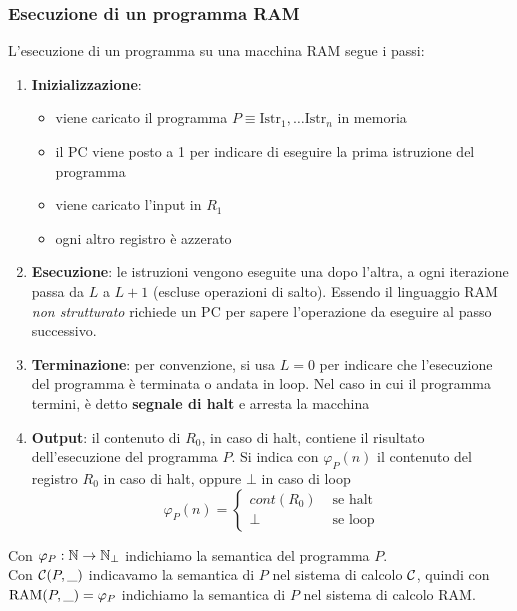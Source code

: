 \begin{center}
	
\end{center}

\subsubsection{Esecuzione di un programma RAM}

L'esecuzione di un programma su una macchina RAM segue i passi:
\begin{enumerate}
	\item \textbf{Inizializzazione}:
	\begin{itemize}
		\item viene caricato il programma $P \equiv \text{Istr}_1, \dots \text{Istr}_n$ in memoria
		\item il PC viene posto a 1 per indicare di eseguire la prima istruzione del programma
		\item viene caricato l'input in $R_1$
		\item ogni altro registro è azzerato
	\end{itemize}
	\item \textbf{Esecuzione}: le istruzioni vengono eseguite una dopo l'altra, a ogni iterazione passa da $L$ a $L+1$ (escluse operazioni di salto). Essendo il linguaggio RAM \textit{non strutturato} richiede un PC per sapere l'operazione da eseguire al passo successivo.
	\item \textbf{Terminazione}: per convenzione, si usa $L=0$ per indicare che l'esecuzione del programma è terminata o andata in loop. Nel caso in cui il programma termini, è detto \textbf{segnale di halt} e arresta la macchina
	\item \textbf{Output}: il contenuto di $R_0$, in caso di halt, contiene il risultato dell'esecuzione del programma $P$. Si indica con $\varphi_P(n)$ il contenuto del registro $R_0$ in caso di halt, oppure $\bot$ in caso di loop
	$$ 
	\varphi_P (n) = \begin{cases}
		cont(R_0) & \text{ se halt} \\
		\bot & \text{ se loop}
	\end{cases}
	$$
\end{enumerate}
Con $\varphi_P: \mathbb{N} \rightarrow \mathbb{N}_\bot$ indichiamo la semantica del programma $P$.\\

Con $\mathcal{C}(P,\_)$ indicavamo la semantica di $P$ nel sistema di calcolo $\mathcal{C}$, quindi con $\text{RAM}(P,\_) = \varphi_P$ indichiamo la semantica di $P$ nel sistema di calcolo RAM.\\

